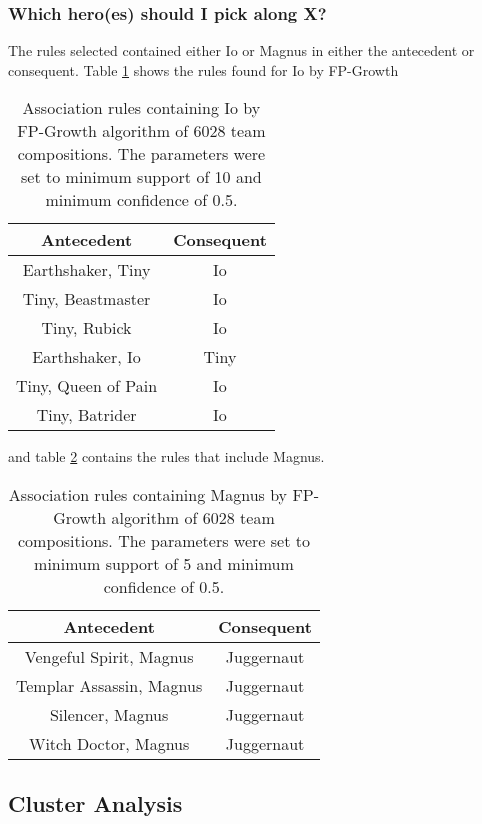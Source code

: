 \documentclass[result.tex]{subfiles}
\begin{document}
\subsubsection*{Which hero(es) should I pick along X?}

The rules selected contained either Io or Magnus in either the antecedent or consequent. Table \ref{tab:ass_io} shows the rules found for Io by FP-Growth

\begin{table}[H]
  \centering
  \begin{tabular}{ | c | c | }
    \hline
    Antecedent & Consequent \\ \hline
    Earthshaker, Tiny & Io \\ \hline
    Tiny, Beastmaster & Io \\ \hline
    Tiny, Rubick & Io \\ \hline
    Earthshaker, Io & Tiny  \\ \hline
    Tiny, Queen of Pain & Io \\ \hline
    Tiny, Batrider & Io \\
    \hline
  \end{tabular}
  \caption{Association rules containing Io by FP-Growth algorithm of 6028 team compositions. The parameters were set to minimum support of 10 and minimum confidence of 0.5.}
  \label{tab:ass_io}
\end{table}
and table \ref{tab:ass_magnus} contains the rules that include Magnus.

\begin{table}[H]
  \centering
  \begin{tabular}{ | c | c | }
    \hline
    Antecedent & Consequent \\ \hline
    Vengeful Spirit, Magnus & Juggernaut \\ \hline
    Templar Assassin, Magnus & Juggernaut \\ \hline
    Silencer, Magnus & Juggernaut \\ \hline
    Witch Doctor, Magnus & Juggernaut  \\
    \hline
  \end{tabular}
  \caption{Association rules containing Magnus by FP-Growth algorithm of 6028 team compositions. The parameters were set to minimum support of 5 and minimum confidence of 0.5.}
  \label{tab:ass_magnus}
\end{table}

\subsection*{Cluster Analysis}
\end{document}
